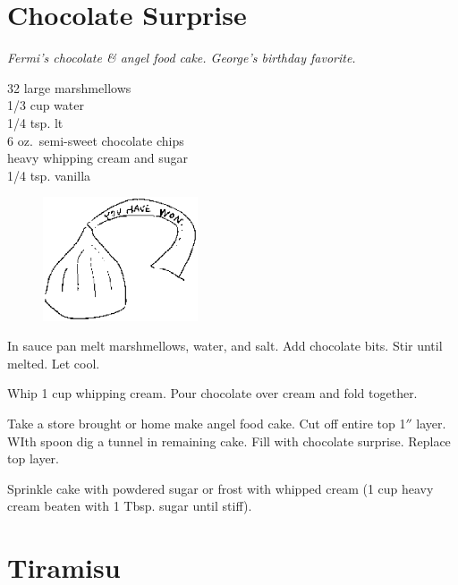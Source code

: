 \section{Chocolate Surprise}

\textit{Fermi's chocolate \& angel food cake.  George's birthday favorite.}
\begin{ingredients}
32 large marshmellows\\
1/3 cup water\\
1/4 tsp. lt\\
6 oz.\ semi-sweet chocolate chips\\
heavy whipping cream and sugar\\
1/4 tsp. vanilla
\end{ingredients}
\begin{figure}
\centerline{\includegraphics[width=1.8in,clip]{kiss.ps}}
\end{figure}
In sauce pan melt marshmellows, water, and salt.  Add chocolate bits.  Stir
until melted.  Let cool.

Whip 1 cup whipping cream.  Pour chocolate over cream and fold together.

Take a store brought or home make angel food cake.  Cut off entire top 1$''$
layer.  WIth spoon dig a tunnel in remaining cake.  Fill with chocolate
surprise.  Replace top layer.

Sprinkle cake with powdered sugar or frost with whipped cream (1 cup heavy
cream beaten with 1 Tbsp. sugar until stiff).  

\section{Tiramisu}

